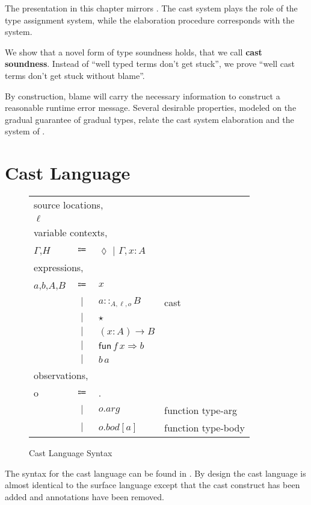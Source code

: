 The presentation in this chapter mirrors .
The cast system plays the role of the type assignment system, while the elaboration procedure corresponds with the \bidir{} system.
 
We show that a novel form of type soundness holds, that we call \textbf{cast soundness}.
Instead of ``well typed terms don't get stuck'', we prove ``well cast terms don't get stuck without blame''.
 
By construction, blame will carry the necessary information to construct a reasonable runtime error message.
Several desirable properties, modeled on the gradual guarantee of gradual types, relate the cast system elaboration and the \bidir{} system of .

\section{Cast Language}
 
\begin{figure}
\begin{tabular}{lcll}
\multicolumn{4}{l}{source locations,}\tabularnewline
$\ensuremath{\ell}$ &  &  & \tabularnewline
\multicolumn{4}{l}{variable contexts,}\tabularnewline
$\Gamma$,$H$ & $\Coloneqq$ & $\lozenge$ $|$ $\Gamma,x:A$ & \tabularnewline
\multicolumn{4}{l}{expressions,}\tabularnewline
$a$,$b$,$A$,$B$ & $\Coloneqq$ & $x$ & \tabularnewline
& $|$ & $a::_{A,\ensuremath{\ell},o}B$ & cast\tabularnewline
& $|$ & $\star$ & \tabularnewline
& $|$ & $\left(x:A\right)\rightarrow B$ & \tabularnewline
& $|$ & $\mathsf{fun}\,f\,x\Rightarrow b$ & \tabularnewline
& $|$ & $b\,a$ & \tabularnewline
\multicolumn{4}{l}{observations,}\tabularnewline
o & $\Coloneqq$ & . & \tabularnewline
& $|$ & $o.arg$ & function type-arg\tabularnewline
& $|$ & $o.bod[a]$ & function type-body\tabularnewline
\end{tabular}


\caption{Cast Language Syntax}
\label{fig:cast-pre-syntax}
\end{figure}

The syntax for the cast language can be found in .
By design the cast language is almost identical to the surface language except that the cast construct has been added and annotations have been removed.

